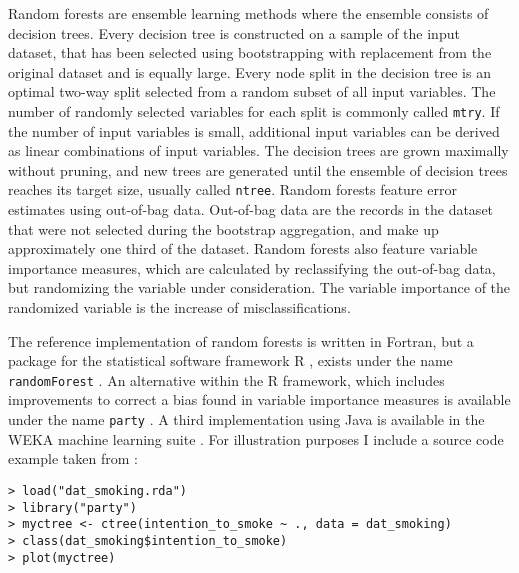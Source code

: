 \documentclass[a4paper,man,12pt,apacite,floatsintext,draftfirst]{apa6} %
\begin{document}
Random forests are ensemble learning methods where the ensemble consists
of decision trees.
Every decision tree is constructed on a sample of the input dataset,
that has been selected using bootstrapping with replacement from the original
dataset and is equally large.
Every node split in the decision tree is an optimal two-way split selected
from a random subset of all input variables.
The number of randomly selected variables for each split is commonly called
\texttt{mtry}.
If the number of input variables is small, additional input variables can be
derived as linear combinations of input variables.
The decision trees are grown maximally without pruning,
and new trees are generated until the ensemble of decision trees reaches its
target size, usually called \texttt{ntree}.
Random forests feature error estimates using out-of-bag data.
Out-of-bag data are the records in the dataset that were not selected during
the bootstrap aggregation, and make up approximately one third of the dataset.
Random forests also feature variable importance measures,
which are calculated by reclassifying the out-of-bag data,
but randomizing the variable under consideration.
The variable importance of the randomized variable is the increase of
misclassifications.

The reference implementation of random forests is written in Fortran,
but a package for the statistical software framework R \cite{rproject2012},
exists under the name \texttt{randomForest} \cite{liaw2002classification}.
An alternative within the R framework, which includes improvements
to correct a bias found in variable
importance measures is available under the name \texttt{party}
\cite{strobl2008conditional}.
A third implementation using Java is available in the WEKA machine learning
suite \cite{hall2009weka}.
For illustration purposes I include a source code example taken from
\cite{strobl2008conditional}:

\begin{framed}
\begin{verbatim}
> load("dat_smoking.rda")
> library("party")
> myctree <- ctree(intention_to_smoke ~ ., data = dat_smoking)
> class(dat_smoking$intention_to_smoke)
> plot(myctree)
\end{verbatim}
\end{framed}
\end{document}
